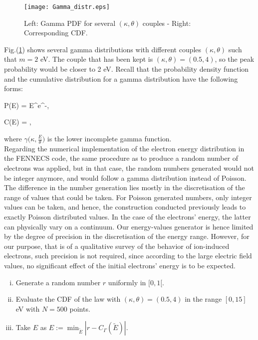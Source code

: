 \begin{figure}[h!]
\centering
	\texttt{[image: Gamma\_distr.eps]}
	\caption{\label{Gamma_distr} Left: Gamma PDF for several $(\kappa, \theta)$ couples - Right: Corresponding CDF. }
\end{figure}  

\noindent Fig.(\ref{Gamma_distr}) shows several gamma distributions with different couples $(\kappa, \theta)$ such that $m=2$ eV. The couple that has been kept is $(\kappa,\theta) = (0.5,4)$, so the peak probability would be closer to 2 eV. Recall that the probability density function and the cumulative distribution for a gamma distribution have the following forms: 

\beq
P(E) = E^{}e^{-},
\eeq

\beq
C(E) = ,
\eeq

\noindent where $\gamma{\Big(\kappa, \frac{E}{\theta}\Big)}$ is the lower incomplete gamma function.\\ 


\noindent Regarding the numerical implementation of the electron energy distribution in the FENNECS code, the same procedure as to produce a random number of electrons was applied, but in that case, the random numbers generated would not be integer anymore, and would follow a gamma distribution instead of Poisson. The difference in the number generation lies mostly in the discretisation of the range of values that could be taken. For Poisson generated numbers, only integer values can be taken, and hence, the construction conducted previously leads to exactly Poisson distributed values. In the case of the electrons' energy, the latter can physically vary on a continuum. Our energy-values generator is hence limited by the degree of precision in the discretisation of the energy range. However, for our purpose, that is of a qualitative survey of the behavior of ion-induced electrons, such precision is not required, since according to the large electric field values, no significant effect of the initial electrons' energy is to be expected. 

\begin{enumerate}[i)]
\item{Generate a random number $r$ uniformly  in $[0,1[. $}
\item{Evaluate the CDF of the law with  $(\kappa,\theta) = (0.5,4)$ in the range $[0,15]$ eV with $N=500$ points.}
\item{Take $E$ as $E := \min_{\tilde{E}} |r-C_{\Gamma}(\tilde{E})|$}.
\end{enumerate}

